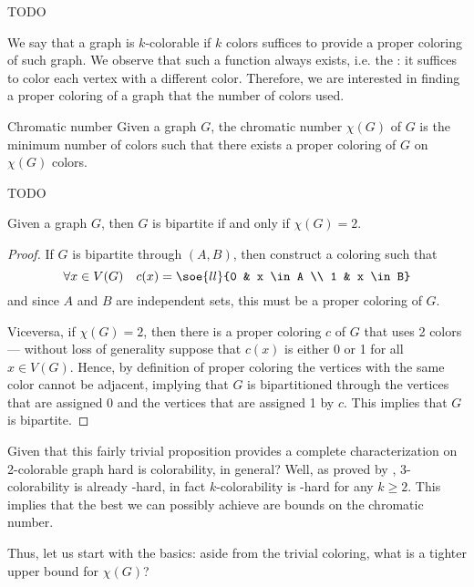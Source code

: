\documentclass[a4paper, 12pt]{report}
\begin{document}
    TODO 

    We say that a graph is $k$-colorable if $k$ colors suffices to provide a proper coloring of such graph. We observe that such a function always exists, i.e. the : it suffices to color each vertex with a different color. Therefore, we are interested in finding a proper coloring of a graph that  the number of colors used.

    \begin{frameddefn}{Chromatic number}
        Given a graph $G$, the chromatic number $\chi(G)$ of $G$ is the minimum number of colors such that there exists a proper coloring of $G$ on $\chi(G)$ colors.
    \end{frameddefn}

    TODO 

    \begin{framedprop}[label={bip col}]{}
        Given a graph $G$, then $G$ is bipartite if and only if $\chi(G) = 2$.
    \end{framedprop}
    
    \begin{proof}
        If $G$ is bipartite through $(A, B)$, then construct a coloring such that $$\forall x \in V(G) \quad c(x) = \soe{ll}{0 & x \in A \\ 1 & x \in B}$$ and since $A$ and $B$ are independent sets, this must be a proper coloring of $G$.

        Viceversa, if $\chi(G) = 2$, then there is a proper coloring $c$ of $G$ that uses 2 colors --- without loss of generality suppose that $c(x)$ is either 0 or 1 for all $x \in V(G)$. Hence, by definition of proper coloring the vertices with the same color cannot be adjacent, implying that $G$ is bipartitioned through the vertices that are assigned 0 and the vertices that are assigned 1 by $c$. This implies that $G$ is bipartite.
    \end{proof}

    Given that this fairly trivial proposition provides a complete characterization on 2-colorable graph hard is colorability, in general? Well, as proved by \textcite{karp}, 3-colorability is already \NPclass-hard, in fact $k$-colorability is \NPclass-hard for any $k \ge 2$. This implies that the best we can possibly achieve are bounds on the chromatic number.

    Thus, let us start with the basics: aside from the trivial coloring, what is a tighter upper bound for $\chi(G)$?
\end{document}
